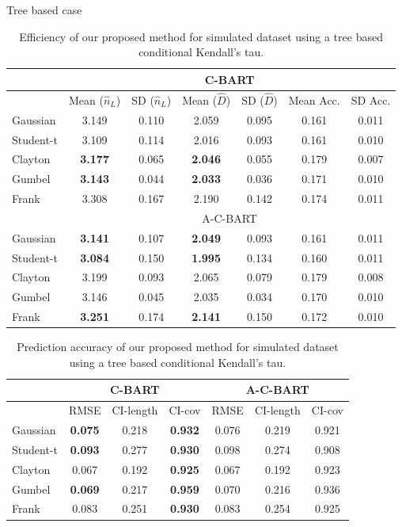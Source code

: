 \documentclass[11pt]{beamer}
\begin{document}
    \begin{frame}[allowframebreaks]{Tree based case}
        \begin{table}[ht]
        \tiny
	\centering
	\begin{tabular}{l|cccccc}
		\multicolumn{1}{c|}{} &
		\multicolumn{6}{c}{C-BART} \\
		\midrule
		& Mean ($\hat{n}_L$) & SD ($\hat{n}_L$) & Mean ($\hat{D}$) & SD ($\hat{D}$) & Mean Acc. & SD Acc. \\ 
		\midrule
		Gaussian & 3.149 & 0.110 & 2.059 & 0.095 & 0.161 & 0.011 \\ 
		Student-t & 3.109 & 0.114 & 2.016 & 0.093 & 0.161 & 0.010 \\ 
		Clayton & \textbf{3.177} & 0.065 & \textbf{2.046} & 0.055 & 0.179 & 0.007 \\ 
		Gumbel & \textbf{3.143} & 0.044 & \textbf{2.033} & 0.036 & 0.171 & 0.010 \\ 
		Frank & 3.308 & 0.167 & 2.190 & 0.142 & 0.174 & 0.011 \\
		\midrule
		\multicolumn{1}{c|}{} &
		\multicolumn{6}{c}{A-C-BART} \\
		\midrule
		Gaussian & \textbf{3.141} & 0.107 & \textbf{2.049} & 0.093 & 0.161 & 0.011 \\ 
		Student-t & \textbf{3.084} & 0.150 & \textbf{1.995} & 0.134 & 0.160 & 0.011 \\ 
		Clayton & 3.199 & 0.093 & 2.065 & 0.079 & 0.179 & 0.008 \\ 
		Gumbel & 3.146 & 0.045 & 2.035 & 0.034 & 0.170 & 0.010 \\ 
		Frank & \textbf{3.251} & 0.174 & \textbf{2.141} & 0.150 & 0.172 & 0.010 \\
	\end{tabular}
	\caption{Efficiency of our proposed method for simulated dataset using a tree based conditional Kendall's tau. }
	\label{tab:eff:ex1}
\end{table}

\begin{table}[ht]
\tiny
	\centering
	\begin{tabular}{l|ccc|ccc}
		\multicolumn{1}{c|}{} &
		\multicolumn{3}{c|}{C-BART} &
		\multicolumn{3}{c}{A-C-BART} \\
		\midrule
		& RMSE & CI-length & CI-cov & RMSE & CI-length & CI-cov \\ 
		\midrule
		Gaussian & \textbf{0.075} & 0.218 & \textbf{0.932} & 0.076 & 0.219 & 0.921 \\ 
		Student-t & \textbf{0.093} & 0.277 & \textbf{0.930} & 0.098 & 0.274 & 0.908 \\ 
		Clayton & 0.067 & 0.192 & \textbf{0.925} & 0.067 & 0.192 & 0.923 \\ 
		Gumbel & \textbf{0.069} & 0.217 & \textbf{0.959} & 0.070 & 0.216 & 0.936 \\ 
		Frank & 0.083 & 0.251 & \textbf{0.930} & 0.083 & 0.254 & 0.925 
	\end{tabular}
	\caption{Prediction accuracy of our proposed method for simulated dataset using a tree based conditional Kendall's tau.}
	\label{tab:pred:ex1}
\end{table}


    \end{frame}
\end{document}
